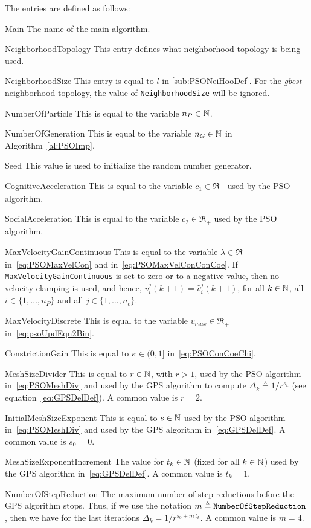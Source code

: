 The entries are defined as follows:
\begin{codedescription}
\item [Main]
The name of the main algorithm.
\item [NeighborhoodTopology]
This entry defines what neighborhood topology is being used.
\item [NeighborhoodSize]
This entry is equal to $l$ in \eqref{sub:PSONeiHooDef}.
For the {\it gbest} neighborhood topology, the value of \texttt{NeighborhoodSize}
will be ignored.
\item [NumberOfParticle]
This is equal to the variable $n_P \in {\mathbb N}$.
\item [NumberOfGeneration]
This is equal to the variable $n_G \in {\mathbb N}$ in Algorithm~\ref{al:PSOImp}.
\item [Seed]
This value is used to initialize the random number generator.
\item [CognitiveAcceleration]
This is equal to the variable $c_1 \in \Re_+$ used by the PSO algorithm.
\item [SocialAcceleration]
This is equal to the variable $c_2 \in \Re_+$ used by the PSO algorithm.
\item [MaxVelocityGainContinuous]
This is equal to the variable $\lambda \in \Re_+$ in~\eqref{eq:PSOMaxVelCon}
and in~\eqref{eq:PSOMaxVelConConCoe}.
If \texttt{MaxVelocityGainContinuous} is set to zero or to a negative value,
then no velocity clamping is used, and hence, $v_i^j(k+1) = \widehat v_i^j(k+1)$,
for all $k \in {\mathbb N}$, all $i \in \{1, \ldots, n_P \}$ and all
$j \in \{1, \ldots, n_c \}$.
\item [MaxVelocityDiscrete]
This is equal to the variable $v_{max} \in \Re_+$ in~\eqref{eq:psoUpdEqn2Bin}.
\item [ConstrictionGain]
This is equal to $\kappa \in (0, 1]$ in~\eqref{eq:PSOConCoeChi}.
\item [MeshSizeDivider]
This is equal to $r \in {\mathbb N}$, with $r > 1$, used 
by the PSO algorithm
in~\eqref{eq:PSOMeshDiv} and used 
by the GPS algorithm
to compute 
$\Delta_k \triangleq  {1} / {r^{s_k}}$ 
(see equation~\eqref{eq:GPSDelDef}).
A common value is $r = 2$.
\item [InitialMeshSizeExponent]
This is equal to $s \in {\mathbb N}$ used 
by the PSO algorithm
in~\eqref{eq:PSOMeshDiv} 
and used 
by the GPS algorithm
in~\eqref{eq:GPSDelDef}.
A common value is $s_0 = 0$.
\item [MeshSizeExponentIncrement]
The value for $t_k \in {\mathbb N}$ (fixed for all $k \in {\mathbb N}$) used 
by the GPS algorithm
in~\eqref{eq:GPSDelDef}.
A common value is $t_k = 1$.
\item [NumberOfStepReduction]
The maximum number of step reductions before the GPS algorithm stops.
Thus, if we use the notation $m \triangleq \text{\texttt{NumberOfStepReduction}}$, then
we have for the last iterations $\Delta_k = {1} / {r^{s_0 + m\, t_k}}$.
A common value is $m = 4$.
\end{codedescription}
